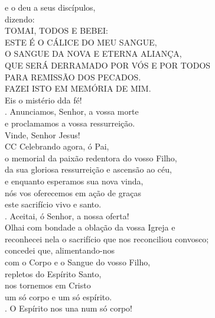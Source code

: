 \documentclass{book}
\begin{document}
\begin{flushleft}
    e o deu a seus discípulos, \\
    dizendo:
    \vspace{.2cm} \\
    TOMAI, TODOS E BEBEI: \\
    ESTE É O CÁLICE DO MEU SANGUE, \\
    O SANGUE DA NOVA E ETERNA ALIANÇA, \\
    QUE SERÁ DERRAMADO POR VÓS E POR TODOS \\
    PARA REMISSÃO DOS PECADOS. \\
    FAZEI ISTO EM MEMÓRIA DE MIM.
    \vspace{.2cm} \\
    Eis o mistério dda fé!
    \vspace{.2cm} \\
    {\color{VioletRed2} \Rbar.} Anunciamos, Senhor, a vossa morte \\
    e proclamamos a vossa ressurreição. \\
    Vinde, Senhor Jesus!
    \vspace{.2cm} \\
    {\color{VioletRed2}CC} Celebrando agora, ó Pai, \\
    o memorial da paixão redentora do vosso Filho, \\
    da sua gloriosa ressurreição e ascensão ao céu, \\
    e enquanto esperamos sua nova vinda, \\
    nós vos oferecemos em ação de graças \\
    este sacrifício vivo e santo.
    \vspace{.2cm} \\
    {\color{VioletRed2} \Rbar.} Aceitai, ó Senhor, a nossa oferta!
    \vspace{.2cm} \\
    Olhai com bondade a oblação da vossa Igreja e \\
    reconhecei nela o sacrifício que nos reconciliou convosco; \\
    concedei que, alimentando-nos \\
    com o Corpo e o Sangue do vosso Filho, \\
    repletos do Espírito Santo, \\
    nos tornemos em Cristo \\
    um só corpo e um só espírito.
    \vspace{.2cm} \\
    {\color{VioletRed2} \Rbar.} O Espírito nos una num só corpo!

\end{flushleft}
\end{document}
